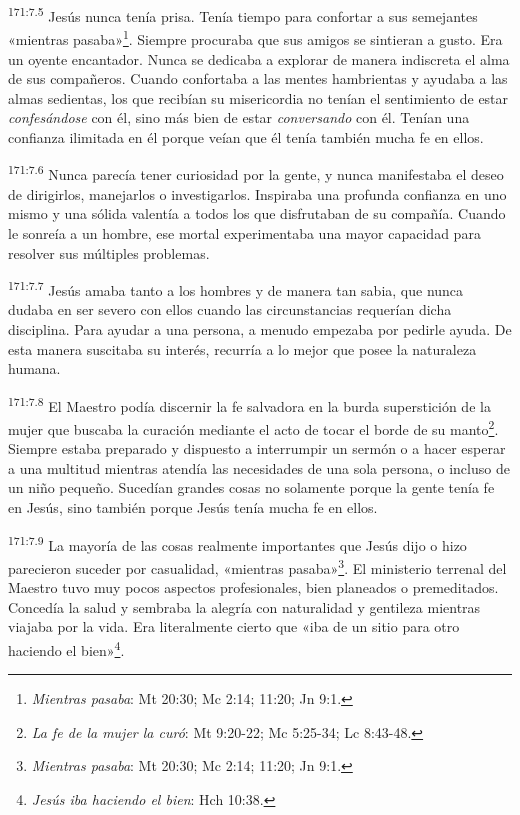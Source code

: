 \par
\textsuperscript{171:7.5} Jesús nunca tenía prisa. Tenía tiempo para confortar a sus semejantes «mientras pasaba»\footnote{\textit{Mientras pasaba}: Mt 20:30; Mc 2:14; 11:20; Jn 9:1.}. Siempre procuraba que sus amigos se sintieran a gusto. Era un oyente encantador. Nunca se dedicaba a explorar de manera indiscreta el alma de sus compañeros. Cuando confortaba a las mentes hambrientas y ayudaba a las almas sedientas, los que recibían su misericordia no tenían el sentimiento de estar \textit{confesándose} con él, sino más bien de estar \textit{conversando} con él. Tenían una confianza ilimitada en él porque veían que él tenía también mucha fe en ellos.

\par
\textsuperscript{171:7.6} Nunca parecía tener curiosidad por la gente, y nunca manifestaba el deseo de dirigirlos, manejarlos o investigarlos. Inspiraba una profunda confianza en uno mismo y una sólida valentía a todos los que disfrutaban de su compañía. Cuando le sonreía a un hombre, ese mortal experimentaba una mayor capacidad para resolver sus múltiples problemas.

\par
\textsuperscript{171:7.7} Jesús amaba tanto a los hombres y de manera tan sabia, que nunca dudaba en ser severo con ellos cuando las circunstancias requerían dicha disciplina. Para ayudar a una persona, a menudo empezaba por pedirle ayuda. De esta manera suscitaba su interés, recurría a lo mejor que posee la naturaleza humana.

\par
\textsuperscript{171:7.8} El Maestro podía discernir la fe salvadora en la burda superstición de la mujer que buscaba la curación mediante el acto de tocar el borde de su manto\footnote{\textit{La fe de la mujer la curó}: Mt 9:20-22; Mc 5:25-34; Lc 8:43-48.}. Siempre estaba preparado y dispuesto a interrumpir un sermón o a hacer esperar a una multitud mientras atendía las necesidades de una sola persona, o incluso de un niño pequeño. Sucedían grandes cosas no solamente porque la gente tenía fe en Jesús, sino también porque Jesús tenía mucha fe en ellos.

\par
\textsuperscript{171:7.9} La mayoría de las cosas realmente importantes que Jesús dijo o hizo parecieron suceder por casualidad, «mientras pasaba»\footnote{\textit{Mientras pasaba}: Mt 20:30; Mc 2:14; 11:20; Jn 9:1.}. El ministerio terrenal del Maestro tuvo muy pocos aspectos profesionales, bien planeados o premeditados. Concedía la salud y sembraba la alegría con naturalidad y gentileza mientras viajaba por la vida. Era literalmente cierto que «iba de un sitio para otro haciendo el bien»\footnote{\textit{Jesús iba haciendo el bien}: Hch 10:38.}.

